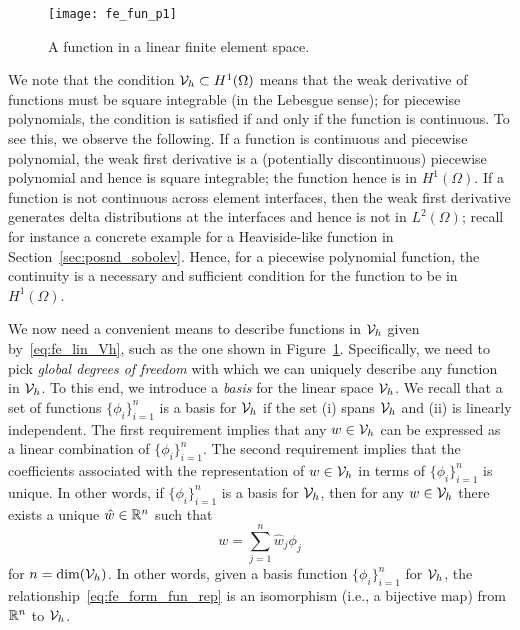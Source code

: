 

\begin{figure}
  \centering
  \texttt{[image: fe\_fun\_p1]}
  \caption{A function in a linear finite element space.}
  \label{fig:fe_fun_p1}
\end{figure}

We note that the condition $\mathcal{V}_h \subset H^1(\Omega)$ means that the weak derivative of functions must be square integrable (in the Lebesgue sense); for piecewise polynomials, the condition is satisfied if and only if the function is continuous.  To see this, we observe the following.  If a function is continuous and piecewise polynomial, the weak first derivative is a (potentially discontinuous) piecewise polynomial and hence is square integrable; the function hence is in $H^1(\Omega)$.  If a function is not continuous across element interfaces, then the weak first derivative generates delta distributions at the interfaces and hence is not in $L^2(\Omega)$; recall for instance a concrete example for a Heaviside-like function in Section~\ref{sec:posnd_sobolev}. Hence, for a piecewise polynomial function, the continuity is a necessary and sufficient condition for the function to be in $H^1(\Omega)$. 

We now need a convenient means to describe functions in $\mathcal{V}_h$ given by~\eqref{eq:fe_lin_Vh}, such as the one shown in Figure~\ref{fig:fe_fun_p1}.  Specifically, we need to pick \emph{global degrees of freedom} with which we can uniquely describe any function in $\mathcal{V}_h$. To this end, we introduce a \emph{basis} for the linear space $\mathcal{V}_h$.  We recall that a set of functions $\{ \phi_i \}_{i=1}^n$ is a basis for $\mathcal{V}_h$ if the set (i) spans $\mathcal{V}_h$ and (ii) is linearly independent. The first requirement implies that any $w \in \mathcal{V}_h$ can be expressed as a linear combination of $\{ \phi_i \}_{i=1}^n$.  The second requirement implies that the coefficients associated with the representation of $w \in \mathcal{V}_h$ in terms of $\{ \phi_i \}_{i=1}^n$ is unique.  In other words, if $\{ \phi_i \}_{i=1}^n$ is a basis for $\mathcal{V}_h$, then for any $w \in \mathcal{V}_h$ there exists a unique $\hat w \in \mathbb{R}^n$ such that
\begin{equation}
  w = \sum_{j=1}^n \hat w_j \phi_j
  \label{eq:fe_form_fun_rep}
\end{equation}
for $n = \text{dim}(\mathcal{V}_h)$. In other words, given a basis function $\{ \phi_i \}_{i=1}^{n}$ for $\mathcal{V}_h$, the relationship~\eqref{eq:fe_form_fun_rep} is an isomorphism (i.e., a bijective map) from $\mathbb{R}^n$ to $\mathcal{V}_h$.

